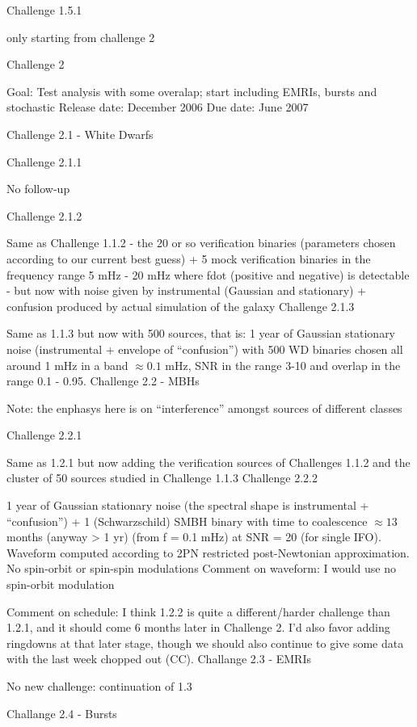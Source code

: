 \documentclass[11pt]{report}
\begin{document}
Challenge 1.5.1

only starting from challenge 2


Challenge 2

Goal: Test analysis with some overalap; start including EMRIs, bursts and stochastic
Release date: December 2006 
Due date: June 2007 

Challenge 2.1 - White Dwarfs

Challenge 2.1.1

No follow-up

Challenge 2.1.2

Same as Challenge 1.1.2 - the 20 or so verification binaries (parameters chosen according to our current best guess) + 5 mock verification binaries in the frequency range 5 mHz - 20 mHz where fdot (positive and negative) is detectable - but now with noise given by instrumental (Gaussian and stationary) + confusion produced by actual simulation of the galaxy
Challenge 2.1.3

Same as 1.1.3 but now with 500 sources, that is: 1 year of Gaussian stationary noise (instrumental + envelope of “confusion”) with 500 WD binaries chosen all around 1 mHz in a band $\approx 0.1$ mHz, SNR in the range 3-10 and overlap in the range 0.1 - 0.95.
Challenge 2.2 - MBHs

Note: the enphasys here is on “interference” amongst sources of different classes

Challenge 2.2.1

Same as 1.2.1 but now adding the verification sources of Challenges 1.1.2 and the cluster of 50 sources studied in Challenge 1.1.3
Challenge 2.2.2

1 year of Gaussian stationary noise (the spectral shape is instrumental + “confusion”) + 1 (Schwarzschild) SMBH binary with time to coalescence $\approx 13$ months (anyway > 1 yr) (from f = 0.1 mHz) at SNR = 20 (for single IFO). Waveform computed according to 2PN restricted post-Newtonian approximation. No spin-orbit or spin-spin modulations
 Comment on waveform: I would use no spin-orbit modulation
 
 Comment on schedule: I think 1.2.2 is quite a different/harder challenge than 1.2.1, and it should come 6 months later in 
 Challenge 2. I'd also favor adding ringdowns at that later stage, though we should also continue to give some
 data with the last week chopped out (CC). 
Challange 2.3 - EMRIs

No new challenge: continuation of 1.3

Challange 2.4 - Bursts
\end{document}
